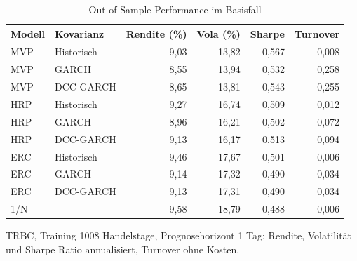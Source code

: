 \begin{table}[htbp]
  \centering
  \footnotesize
  \begin{tabular}{llrrrr}
    \toprule
    Modell & Kovarianz & Rendite (\%) & Vola (\%) & Sharpe & Turnover \\
    \midrule
    MVP & Historisch & 9,03 & 13,82 & 0,567 & 0,008 \\
    MVP & GARCH & 8,55 & 13,94 & 0,532 & 0,258 \\
    MVP & DCC-GARCH & 8,65 & 13,81 & 0,543 & 0,255 \\
    \midrule
    HRP & Historisch & 9,27 & 16,74 & 0,509 & 0,012 \\
    HRP & GARCH & 8,96 & 16,21 & 0,502 & 0,072 \\
    HRP & DCC-GARCH & 9,13 & 16,17 & 0,513 & 0,094 \\
    \midrule
    ERC & Historisch & 9,46 & 17,67 & 0,501 & 0,006 \\
    ERC & GARCH & 9,14 & 17,32 & 0,490 & 0,034 \\
    ERC & DCC-GARCH & 9,13 & 17,31 & 0,490 & 0,034 \\
    \midrule
    1/N & -- & 9,58 & 18,79 & 0,488 & 0,006 \\
    \bottomrule
  \end{tabular}
  \caption{Out-of-Sample-Performance im Basisfall}
  \label{tab:oekonomie_basis}
  \begin{minipage}{\linewidth}\vspace{0.4em}\centering\footnotesize
  TRBC, Training 1008 Handelstage, Prognosehorizont 1 Tag; Rendite, Volatilität und Sharpe Ratio annualisiert, Turnover ohne Kosten.
  \end{minipage}
\end{table}

